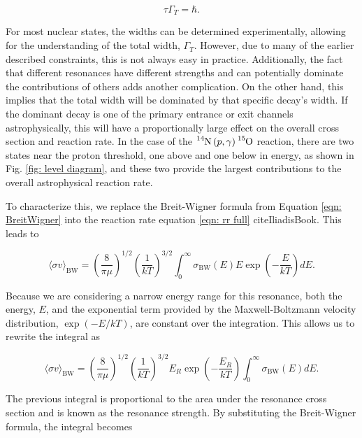\begin{equation}
\tau \Gamma_{T} = \hbar.
\label{eqn: width to lifetime}
\end{equation}

For most nuclear states, the widths can be determined experimentally, allowing for the understanding of the total width, $\Gamma_{T}$. However, due to many of the earlier described constraints, this is not always easy in practice. Additionally, the fact that different resonances have different strengths and can potentially dominate the contributions of others adds another complication. On the other hand, this implies that the total width will be dominated by that specific decay's width. If the dominant decay is one of the primary entrance or exit channels astrophysically, this will have a proportionally large effect on the overall cross section and reaction rate. In the case of the $\ce{^{14}N} \left( p, \gamma \right) \ce{^{15}O}$ reaction, there are two states near the proton threshold, one above and one below in energy, as shown in Fig. \ref{fig: level diagram}, and these two provide the largest contributions to the overall astrophysical reaction rate.

To characterize this, we replace the Breit-Wigner formula from Equation \ref{eqn: BreitWigner} into the reaction rate equation \ref{eqn: rr full} cite{IliadisBook}. This leads to 

\begin{equation}
\langle \sigma v \rangle_{\text{BW}} = \left( \frac{8}{\pi \mu} \right) ^{1/2} \left( \frac{1}{kT} \right) ^{3/2} \int_{0}^{\infty} \sigma_{\text{BW} }(E) E \exp \left(-\dfrac{E}{kT} \right) dE.
\label{eqn: reaction rate BW}
\end{equation}

\noindent Because we are considering a narrow energy range for this resonance, both the energy, $E$, and the exponential term provided by the Maxwell-Boltzmann velocity distribution, $\exp \left( -E / kT \right)$, are constant over the integration. This allows us to rewrite the integral as

\begin{equation}
\langle \sigma v \rangle_{\text{BW}} = \left( \frac{8}{\pi \mu} \right) ^{1/2} \left( \frac{1}{kT} \right) ^{3/2} E_{R} \exp \left(-\dfrac{E_{R}}{kT} \right) \int_{0}^{\infty} \sigma_{\text{BW}} (E) dE.
\end{equation}

\noindent The previous integral is proportional to the area under the resonance cross section and is known as the resonance strength. By substituting the Breit-Wigner formula, the integral becomes

